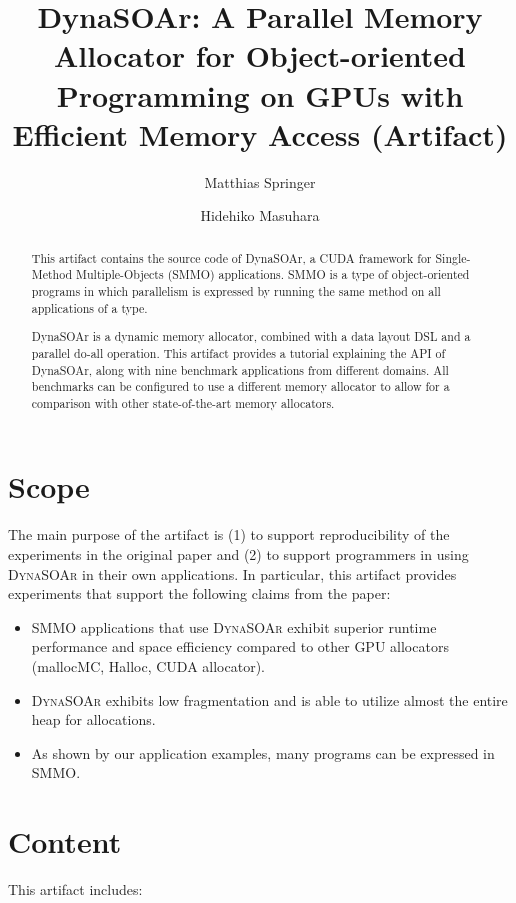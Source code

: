 \documentclass[a4paper,USenglish]{darts-v2019}
\title{DynaSOAr: A Parallel Memory Allocator for Object-oriented Programming on GPUs with Efficient Memory Access (Artifact)}
\author{Matthias Springer}{Tokyo Institute of Technology}{matthias.springer@acm.org}{}{}%
\author{Hidehiko Masuhara}{Tokyo Institute of Technology}{masuhara@acm.org}{}{}
\begin{document}
\maketitle






\begin{abstract}
This artifact contains the source code of DynaSOAr, a CUDA framework for Single-Method Multiple-Objects (SMMO) applications. SMMO is a type of object-oriented programs in which parallelism is expressed by running the same method on all applications of a type. 

DynaSOAr is a dynamic memory allocator, combined with a data layout DSL and a parallel do-all operation. This artifact provides a tutorial explaining the API of DynaSOAr, along with nine benchmark applications from different domains. All benchmarks can be configured to use a different memory allocator to allow for a comparison with other state-of-the-art memory allocators.
\end{abstract}

\section{Scope}
The main purpose of the artifact is (1) to support reproducibility of the experiments in the original paper and (2) to support programmers in using \textsc{DynaSOAr} in their own applications. In particular, this artifact provides experiments that support the following claims from the paper:

\begin{itemize}
  \item SMMO applications that use  \textsc{DynaSOAr} exhibit superior runtime performance and space efficiency compared to other GPU allocators (mallocMC, Halloc, CUDA allocator).
  \item \textsc{DynaSOAr} exhibits low fragmentation and is able to utilize almost the entire heap for allocations.
  \item As shown by our application examples, many programs can be expressed in SMMO.
\end{itemize}

\section{Content}
This artifact includes:
\end{document}
